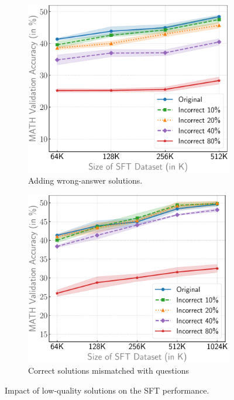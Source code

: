 \begin{figure}[ht]
    \centering
    \begin{subfigure}[b]{0.45\textwidth}
        \captionsetup{justification=centering}
        \centering
        \includegraphics[width=\textwidth]{plots/noise_solution_with_err_bar.pdf}  %
        \caption{Adding wrong-answer solutions.}
        \label{fig:figure1}
    \end{subfigure}
    \hfill
    \begin{subfigure}[b]{0.45\textwidth}
    \captionsetup{justification=centering}
        \centering
        \includegraphics[width=\textwidth]{plots/noise_pairing_with_err_bar.pdf}  %
        \caption{Correct solutions mismatched with questions}
        \label{fig:figure2}
    \end{subfigure}
    
    \captionsetup{justification=centering}\caption{Impact of low-quality solutions on the SFT performance. }
    \label{fig:incorrect_solutions}
\end{figure}
